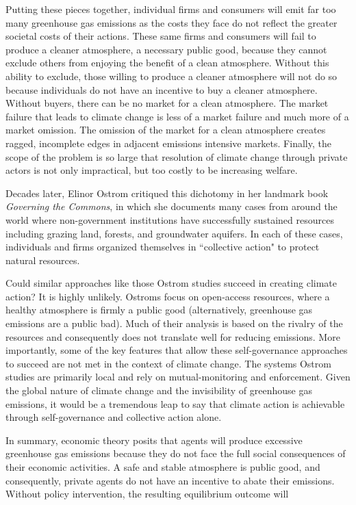 Putting these pieces together, individual firms and consumers will emit far too many greenhouse gas emissions as the costs they face do not reflect the greater societal costs of their actions. These same firms and consumers will fail to produce a cleaner atmosphere, a necessary public good, because they cannot exclude others from enjoying the benefit of a clean atmosphere. Without this ability to exclude, those willing to produce a cleaner atmosphere will not do so because individuals do not have an incentive to buy a cleaner atmosphere. Without buyers, there can be no market for a clean atmosphere. The market failure that leads to climate change is less of a market failure and much more of a market omission. The omission of the market for a clean atmosphere creates ragged, incomplete edges in adjacent emissions intensive markets. Finally, the scope of the problem is so large that resolution of climate change through private actors is not only impractical, but too costly to be increasing welfare.


Decades later, Elinor Ostrom critiqued this dichotomy in her landmark book \textit{Governing the Commons}, in which she documents many cases from around the world where non-government institutions have successfully sustained resources including grazing land, forests, and groundwater aquifers. In each of these cases, individuals and firms organized themselves in ``collective action" to protect natural resources. 

Could similar approaches like those Ostrom studies succeed in creating climate action? It is highly unlikely. Ostroms focus on open-access resources, where a healthy atmosphere is firmly a public good (alternatively, greenhouse gas emissions are a public bad). Much of their analysis is based on the rivalry of the resources and consequently does not translate well for reducing emissions. More importantly, some of the key features that allow these self-governance approaches to succeed are not met in the context of climate change. The systems Ostrom studies are primarily local and rely on mutual-monitoring and enforcement. Given the global nature of climate change and the invisibility of greenhouse gas emissions, it would be a tremendous leap to say that climate action is achievable through self-governance and collective action alone. 

In summary, economic theory posits that agents will produce excessive greenhouse gas emissions because they do not face the full social consequences of their economic activities. A safe and stable atmosphere is public good, and consequently, private agents do not have an incentive to abate their emissions. Without policy intervention, the resulting equilibrium outcome will 

